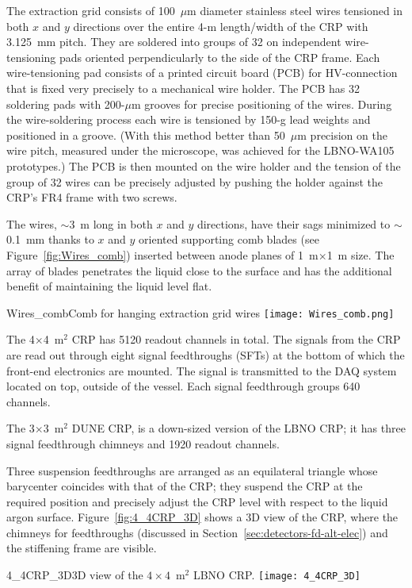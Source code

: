 The extraction grid consists of 100~$\mu$m diameter stainless steel
wires tensioned in both $x$ and $y$ directions over the entire 4-m
length/width of the CRP  with 3.125~mm
pitch. They are soldered into groups of 32 on independent
wire-tensioning pads oriented perpendicularly to the side of the CRP
frame.  Each wire-tensioning pad consists of a printed circuit board
(PCB) for HV-connection that is fixed very precisely to a mechanical 
wire holder. The PCB has 32 soldering pads with 200-$\mu$m grooves for
precise positioning of the wires. During the wire-soldering process
each wire is tensioned by 150-g lead weights and positioned in a
groove.  (With this method better than 50~$\mu$m precision on the wire
pitch, measured under the microscope, was achieved for the LBNO-WA105
prototypes.) The PCB is then mounted on the wire holder and the
tension of the group of 32 wires can be precisely adjusted by pushing
the holder against the CRP's FR4 frame with two screws.

The wires, $\sim$3~m long in both $x$ and $y$ directions,
have their sags minimized to $\sim$0.1~mm thanks to $x$ and $y$ oriented
supporting comb blades
  (see Figure~\ref{fig:Wires_comb}) inserted
between anode planes of 1~m$\times$1~m size. The array of blades
penetrates the liquid close to the surface and has the additional
benefit of maintaining the liquid level flat. 
\begin{cdrfigure}{Wires_comb}{Comb for hanging extraction grid wires}
\texttt{[image: Wires\_comb.png]}
\end{cdrfigure}

The 4$\times$4~m$^2$ CRP has 5120 readout channels in total. The
signals from the CRP are read out through eight signal feedthroughs
(SFTs) %
at the bottom of which the front-end electronics are mounted. The signal
is transmitted to the DAQ system located on top, outside of the vessel.
Each signal feedthrough groups 640 channels. 

The 3$\times$3~m$^2$ DUNE CRP, is a down-sized version of the LBNO
CRP; it has three signal feedthrough chimneys and 1920 readout
channels.

Three suspension
feedthroughs are arranged as an equilateral triangle whose barycenter
coincides with that of the CRP; they suspend the CRP at the required
position and precisely adjust the CRP level with respect to the liquid
argon surface. Figure~\ref{fig:4_4CRP_3D} shows a 3D view of the CRP,
where the chimneys for feedthroughs (discussed in 
Section~\ref{sec:detectors-fd-alt-elec}) and the stiffening frame are
visible.
\begin{cdrfigure}{4_4CRP_3D}{3D view of the $4\times4$~m$^2$ LBNO CRP.}
\texttt{[image: 4\_4CRP\_3D]}  
\end{cdrfigure}



